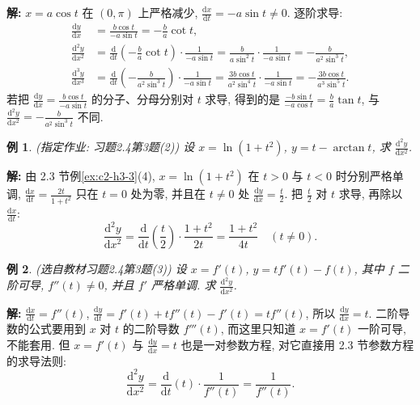 \documentclass[UTF8,openany]{ctexbook}
\theoremstyle{chinesetextbook}
\newtheorem{example}{例}[section]
\newenvironment{cnsolution}{\par\indent\textbf{解:} \ignorespaces}{\par}
\newcommand{\dd}{\mathrm d}
\begin{document}
\begin{cnsolution}
$x=a\cos t$ 在 $(0,\pi)$ 上严格减少, $\displaystyle\frac{\dd x}{\dd t}=-a\sin t\ne0$. 逐阶求导:
\[
\begin{aligned}
\frac{\dd y}{\dd x}&=\frac{b\cos t}{-a\sin t}=-\frac ba\cot t,\\
\frac{\dd^2y}{\dd x^2}&=\frac{\dd}{\dd t}\left(-\frac ba\cot t\right)\cdot\frac1{-a\sin t}=\frac b{a\sin^2t}\cdot\frac1{-a\sin t}=-\frac b{a^2\sin^3t},\\
\frac{\dd^3y}{\dd x^3}&=\frac{\dd}{\dd t}\left(-\frac b{a^2\sin^3t}\right)\cdot\frac1{-a\sin t}=\frac{3b\cos t}{a^2\sin^4t}\cdot\frac1{-a\sin t}=-\frac{3b\cos t}{a^3\sin^5t}.
\end{aligned}
\]
若把 $\displaystyle\frac{\dd y}{\dd x}=\frac{b\cos t}{-a\sin t}$ 的分子、分母分别对 $t$ 求导, 得到的是 $\displaystyle\frac{-b\sin t}{-a\cos t}=\frac ba\tan t$, 与 $\displaystyle\frac{\dd^2y}{\dd x^2}=-\frac b{a^2\sin^3t}$ 不同.
\end{cnsolution}
\begin{example}\label{ex:c2-h4-3b}
\textnormal{(指定作业: 习题2.4第3题(2))} 设 $x=\ln(1+t^2)$, $y=t-\arctan t$, 求 $\displaystyle\frac{\dd^2y}{\dd x^2}$.
\end{example}
\begin{cnsolution}
由 2.3 节例\ref{ex:c2-h3-3}(4), $x=\ln(1+t^2)$ 在 $t>0$ 与 $t<0$ 时分别严格单调, $\displaystyle\frac{\dd x}{\dd t}=\frac{2t}{1+t^2}$ 只在 $t=0$ 处为零, 并且在 $t\ne0$ 处 $\displaystyle\frac{\dd y}{\dd x}=\frac t2$. 把 $\displaystyle\frac t2$ 对 $t$ 求导, 再除以 $\displaystyle\frac{\dd x}{\dd t}$:
\[
\frac{\dd^2y}{\dd x^2}=\frac{\dd}{\dd t}\left(\frac t2\right)\cdot\frac{1+t^2}{2t}=\frac{1+t^2}{4t}\quad(t\ne0).
\]
\end{cnsolution}
\begin{example}\label{ex:c2-h4-3}
\textnormal{(选自教材习题2.4第3题(3))} 设 $x=f'(t)$, $y=tf'(t)-f(t)$, 其中 $f$ 二阶可导, $f''(t)\ne0$, 并且 $f'$ 严格单调. 求 $\displaystyle\frac{\dd^2y}{\dd x^2}$.
\end{example}
\begin{cnsolution}
$\displaystyle\frac{\dd x}{\dd t}=f''(t)$, $\displaystyle\frac{\dd y}{\dd t}=f'(t)+tf''(t)-f'(t)=tf''(t)$, 所以 $\displaystyle\frac{\dd y}{\dd x}=t$. 二阶导数的公式要用到 $x$ 对 $t$ 的二阶导数 $f'''(t)$, 而这里只知道 $x=f'(t)$ 一阶可导, 不能套用. 但 $x=f'(t)$ 与 $\displaystyle\frac{\dd y}{\dd x}=t$ 也是一对参数方程, 对它直接用 2.3 节参数方程的求导法则:
\[
\frac{\dd^2y}{\dd x^2}=\frac{\dd}{\dd t}(t)\cdot\frac1{f''(t)}=\frac1{f''(t)}.
\]
\end{cnsolution}
\end{document}
